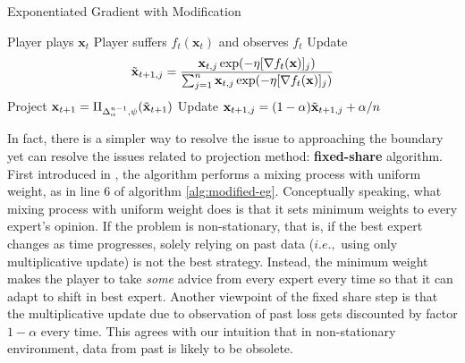 \documentclass[12pt, a4paper]{report}
\begin{document}
\begin{algorithm}
\caption{Exponentiated Gradient with Modification} \label{alg:modified-eg}
\begin{algorithmic}[1]
\State Player plays $\mathbf{x}_t$
\State Player suffers $f_t(\mathbf{x}_t)$ and observes $f_t$
\State Update 
\[\Tilde{\mathbf{x}}_{t+1, j} = \frac{\mathbf{x}_{t,j} \exp(-\eta [\nabla f_t(\mathbf{x})]_j)}{\sum_{j=1}^n \mathbf{x}_{t, j} \exp(-\eta [\nabla f_t(\mathbf{x})]_j)}
\]
\Statex [Projection]
\State Project $\mathbf{x}_{t+1} = \Pi_{\Delta_{\alpha}^{n-1}, \psi}(\Tilde{\mathbf{x}}_{t+1})$
\State Update $\mathbf{x}_{t+1, j} = (1 - \alpha) \Tilde{\mathbf{x}}_{t+1, j} + \alpha/n $ 
\EndFor
\end{algorithmic}
\end{algorithm}

In fact, there is a simpler way to resolve the issue to approaching the boundary yet can resolve the issues related to projection method: \textbf{fixed-share} algorithm. First introduced in \cite{Herbster1995TrackingTB}, the algorithm performs a mixing process with uniform weight, as in line 6 of algorithm \ref{alg:modified-eg}. Conceptually speaking, what mixing process with uniform weight does is that it sets minimum weights to every expert's opinion. If the problem is non-stationary, that is, if the best expert changes as time progresses, solely relying on past data ($i.e.,$ using only multiplicative update) is not the best strategy. Instead, the minimum weight makes the player to take \textit{some} advice from every expert every time so that it can adapt to shift in best expert. Another viewpoint of the fixed share step is that the multiplicative update due to observation of past loss gets discounted by factor $1 - \alpha$ every time. This agrees with our intuition that in non-stationary environment, data from past is likely to be obsolete.
\end{document}

